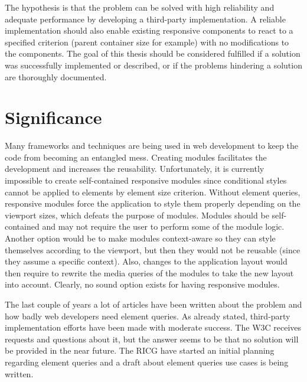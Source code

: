\documentclass[a4paper,11pt]{kth-mag}
\begin{document}
      The hypothesis is that the problem can be solved with high reliability and adequate performance by developing a \gls{third-party} implementation.
      A reliable implementation should also enable existing \gls{responsive} components to react to a specified criterion (parent container size for example) with no modifications to the components.
      The goal of this thesis should be considered fulfilled if a solution was successfully implemented or described, or if the problems hindering a solution are thoroughly documented.

    \section{Significance}
      Many frameworks and techniques are being used in \gls{web} development to keep the code from becoming an entangled mess.
      Creating modules facilitates the development and increases the reusability.
      Unfortunately, it is currently impossible to create \gls{self-contained} \gls{responsive} modules since conditional styles cannot be applied to \glspl{element} by \gls{element} size criterion.
      Without element queries, \gls{responsive} modules force the application to style them properly depending on the \gls{viewport} sizes, which defeats the purpose of modules.
      Modules should be \gls{self-contained} and may not require the user to perform some of the module logic.
      Another option would be to make modules context-aware so they can style themselves according to the \gls{viewport}, but then they would not be reusable (since they assume a specific context).
      Also, changes to the application layout would then require to rewrite the \gls{media queries} of the modules to take the new layout into account.
      Clearly, no sound option exists for having \gls{responsive} modules.

      The last couple of years a lot of articles have been written about the problem and how badly \gls{web} developers need element queries.
      As already stated, \gls{third-party} implementation efforts have been made with moderate success.
      The \gls{W3C} receives requests and questions about it, but the answer seems to be that no solution will be provided in the near future.
      The \gls{RICG} have started an initial planning regarding element queries and a draft \cite{ricg_draft} about element queries use cases is being written.
\end{document}
